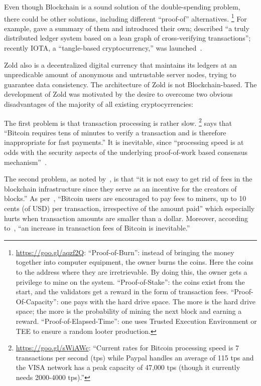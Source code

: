 \documentclass[11pt,oneside]{article}
\begin{document}
Even though Blockchain is a sound solution of the double-spending
problem, there could be other solutions,
including different ``proof-of'' alternatives.%
\footnote{%
  \url{https://goo.gl/aqzf2Q}:
  ``Proof-of-Burn'': instead of bringing the money together into computer equipment,
  the owner burns the coins. Here the coins to the address where they are
  irretrievable. By doing this, the owner gets a privilege to
  mine on the system.
  ``Proof-of-Stake'': the coins exist from the start, and
  the validators get a reward in the form of transaction fees.
  ``Proof-Of-Capacity'': one pays with the hard drive space. The more
  is the hard drive space; the more is the probability of mining
  the next block and earning a reward.
  ``Proof-of-Elapsed-Time'': one uses Trusted Execution Environment or TEE
  to ensure a random looter production.
}
For example, \textcite{everaere2010} gave
a summary of them and introduced their own;
\textcite{boyen2016} described
``a truly distributed ledger system based on a lean graph of cross-verifying transactions'';
recently IOTA, a ``tangle-based cryptocurrency,'' was launched~\parencite{popov2017}.

Zold also is a decentralized digital currency that maintains its ledgers
at an unpredicable amount of anonymous and untrustable server nodes, trying to guarantee
data consistency. The architecture of Zold is not Blockchain-based.
The development of Zold was motivated by the desire to overcome
two obvious disadvantages of the majority of all existing cryptocyrrencies:

The first problem is that transaction processing is rather slow.%
\footnote{%
  \url{https://goo.gl/sWiAWc}:
  ``Current rates for Bitcoin processing
  speed is 7 transactions per second (tps) while Paypal handles
  an average of 115 tps and the VISA
  network has a peak capacity of 47,000 tps (though it currently needs 2000-4000 tps).''
}
\textcite{karame2012} says that ``Bitcoin requires tens of minutes to verify a transaction
and is therefore inappropriate for fast payments.''
It is inevitable, since
``processing speed is at odds with the security aspects of the underlying
proof-of-work based consensus mechanism''~\parencite{kiayias2015}.

The second problem, as noted by~\textcite{popov2017}, is that ``it is not easy to get rid
of fees in the blockchain infrastructure since they serve
as an incentive for the creators of blocks.''
As per~\textcite{moser2015}, ``Bitcoin users are encouraged to
pay fees to miners, up to 10 cents (of USD) per transaction, irrespective of the
amount paid'' which especially hurts when transaction amounts are smaller than a dollar.
Moreover, according to~\textcite{kaskaloglu2014},
``an increase in transaction fees of Bitcoin is inevitable.''
\end{document}
